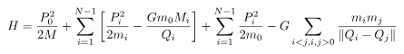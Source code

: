 \documentclass[preview]{standalone}
\begin{document}
\begin{align*}
\special{dvisvgm:raw <g id='unique000'>}H = \frac{P_0^2}{2M} + \sum_{i=1}^{N-1} \left[ \frac{P^2_i}{2m_i} - \frac{G m_0 M_i}{Q_i}  \right] + \sum^{N-1}_{i=1} \frac{P^2_i}{2m_0} - G \sum_{i<j, i,j > 0} \frac{m_i m_j}{\norm{Q_i-Q_j}}\special{dvisvgm:raw </g>}
\end{align*}
\end{document}
